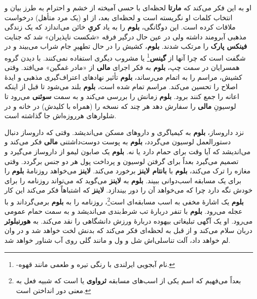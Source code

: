\documentclass[12pt]{book}
\newcommand{\noun}[1]{{\textbf{#1}}}
\begin{document}
    او به این فکر می‌کند که \noun{مارتا} لحظه‌ای با حسی آمیخته از خشم و احترام به طرز بیان و انتخاب کلمات او نگریسته است و لحظه‌ای بعد، از او (یک مرد متأهل) درخواست ملاقات کرده است. این دوگانگی، \noun{بلوم} را به یاد \noun{کریِ} خائن می‌اندازد که یک زندگی مذهبی آبرومند داشته ولی در عین حال درگیر فرقه «شکست ناپذیران» شد که جنایت \noun{فینکس پارک} را مرتکب شدند. \noun{بلوم}، کشیش را در حال تطهیرِ جام شراب می‌بیند و در شگفت است که چرا آنها از \noun{گینس}\footnote{-نام آبجویی ایرلندی با رنگی تیره و طعمی مانند قهوه.} یا مشروب دیگری استفاده نمی‌کنند. با دیدن گروه همسرایان در سمت چپ، \noun{بلوم} به فکر اجرای \noun{مالی} از «مادر غمگین» می‌افتد. وقتی کشیش، مراسم را به اتمام می‌رساند، \noun{بلوم} تأثیر نهادهای اعتراف‌گیری مذهبی و ایدهٔ اصلاح را تحسین می‌کند. مراسم تمام شده است، \noun{بلوم} بلند می‌شود تا قبل از اینکه اعانه را جمع کنند برود. \noun{بلوم} زمانش را بررسی می‌کند و به سمت \noun{سوئنی} می‌رود تا لوسیونِ \noun{مالی} را سفارش دهد هر چند که نسخه را (همراه با کلیدش) در خانه و در شلوارهای هرروزه‌اش جا گذاشته است.

    نزد داروساز، \noun{بلوم} به کیمیاگری و داروهای مسکن می‌اندیشد. وقتی که داروساز دنبال دستورالعمل لوسیون می‌گردد، \noun{بلوم} به پوست دوست‌داشتنی \noun{مالی} فکر می‌کند و می‌اندیشد که آیا وقت برای حمام دارد یا نه. \noun{بلوم} یک صابون لیمو از داروساز می‌گیرد و تصمیم می‌گیرد بعداً برای گرفتن لوسیون و پرداخت پول هر دو جنس برگردد. وقتی مغازه را ترک می‌کند، \noun{بلوم} با \noun{بانتام لاینز} برخورد می‌کند. \noun{لاینز} می‌خواهد روزنامهٔ \noun{بلوم} را برای یک مسابقه اسب‌دوانی ببیند. \noun{بلوم} به \noun{لاینز} می‌گوید که می‌تواند روزنامه را برای خودش نگه دارد چرا که می‌خواهد آن را دور بیندازد. \noun{لاینز} که اشتباهاً فکر می‌کند این کار \noun{بلوم} یک اشارهٔ مخفی به اسب مسابقه‌ای است\footnote{بعداً می‌فهیم که اسم یکی از اسب‌های مسابقه \noun{ثرواوی} یا  است که شبیه فعل  به معنی دور انداختن است.}، روزنامه را به \noun{بلوم} برمی‌گرداند و با عجله می‌رود. \noun{بلوم} با تنفر دربارهٔ تب شرط‌بندی می‌اندیشد و به سمت حمام عمومی می‌رود. او یک آگهی تبلیغاتی بیهوده دربارهٔ ورزش دانشگاهی را نقد می‌کند. به \noun{هورنبلوئر} دربان سلام می‌کند و از قبل به لحظه‌ای فکر می‌کند که بدنش لخت خواهد شد و در وان لم خواهد داد، آلت تناسلی‌اش شل و ول و مانند گلی روی آب شناور خواهد شد.
\end{document}
